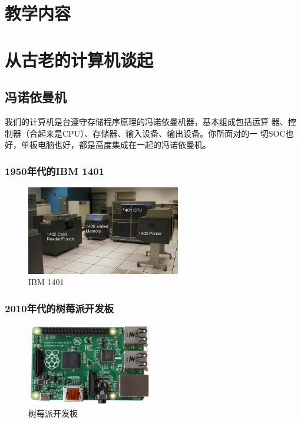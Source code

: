 \newpage
\section*{教学内容}
\sline

\section{从古老的计算机谈起}

\subsection{冯诺依曼机}

我们的计算机是台遵守存储程序原理的冯诺依曼机器，基本组成包括{\hei 运算
  器、控制器（合起来是CPU）、存储器、输入设备、输出设备}。你所面对的一
切SOC也好，单板电脑也好，都是高度集成在一起的冯诺依曼机。

\subsubsection{1950年代的IBM 1401}

\begin{figure}[htb]
\centering
\includegraphics[width=0.6\textwidth]{images/Terminal-application-programming/fig-old-computer-01.jpg}
\caption{IBM 1401}
\label{fig:old-computer-01.jpg}
\end{figure}

\subsubsection{2010年代的树莓派开发板}

\begin{figure}[htb]
\centering
\includegraphics[width=0.5\textwidth]{images/Terminal-application-programming/fig-Raspberry-Pi-Board.png}
\caption{树莓派开发板}
\label{fig:Raspberry-Pi-Board}
\end{figure}


